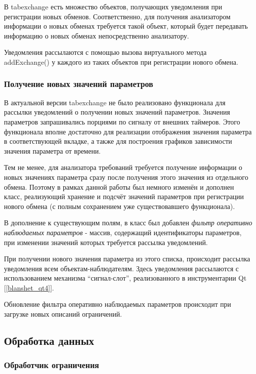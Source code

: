 В tabexchange есть множество объектов, получающих уведомления при 
регистрации новых обменов. Соответственно, для получения анализатором 
информации о новых обменах требуется такой объект, который будет 
передавать информацию о новых обменах непосредственно анализатору.

Уведомления рассылаются с помощью вызова виртуального метода addExchange() у 
каждого из таких объектов при регистрации нового обмена.

\subsubsection{Получение новых значений параметров}

В актуальной версии tabexchange не было реализовано функционала для рассылки 
уведомлений о получении новых значений параметров. Значения параметров 
запрашивались порциями по сигналу от внешних таймеров. Этого функционала вполне 
достаточно для реализации отображения значения параметра в соответствующей 
вкладке, а также для построения графиков зависимости значения параметра от 
времени. 

Тем не менее, для анализатора требований требуется получение 
информации о новых значениях параметра сразу после получения этого значения из 
отдельного обмена. Поэтому в рамках данной работы был немного изменён и 
дополнен класс, реализующий хранение и подсчёт значений параметров при 
регистрации нового обмена (с полным сохранением уже существовавшего 
функционала).

В дополнение к существующим полям, в класс был добавлен \textit{фильтр 
оперативно наблюдаемых параметров} - массив, содержащий идентификаторы 
параметров, при изменении значений которых требуется рассылка уведомлений.

При получении нового значения параметра из этого списка, происходит рассылка 
уведомления всем объектам-наблюдателям. Здесь уведомления рассылаются 
с использованием механизма ``сигнал-слот'', реализованного в инструментарии Qt 
[\ref{blanshet_qt4}].

Обновление фильтра оперативно наблюдаемых параметров происходит при загрузке 
новых описаний ограничений.


\subsection{Обработка данных}

\subsubsection{Обработчик ограничения}

